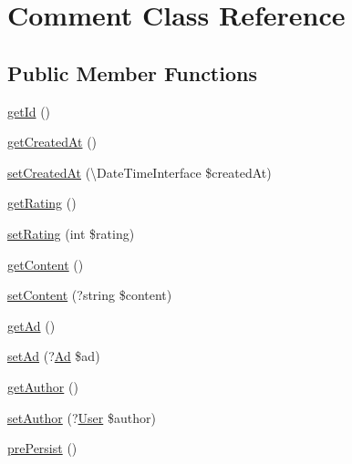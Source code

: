 \hypertarget{class_app_1_1_entity_1_1_comment}{}\section{Comment Class Reference}
\label{class_app_1_1_entity_1_1_comment}
\subsection*{Public Member Functions}
\begin{DoxyCompactItemize}
\item 
\mbox{\hyperlink{class_app_1_1_entity_1_1_comment_a12251d0c022e9e21c137a105ff683f13}{get\+Id}} ()
\item 
\mbox{\hyperlink{class_app_1_1_entity_1_1_comment_a0f0455d4aafe27d1b0720c3bcfff2847}{get\+Created\+At}} ()
\item 
\mbox{\hyperlink{class_app_1_1_entity_1_1_comment_a2308609ef549a753223bbee71e36291e}{set\+Created\+At}} (\textbackslash{}Date\+Time\+Interface \$created\+At)
\item 
\mbox{\hyperlink{class_app_1_1_entity_1_1_comment_a209cc2a79146f673389564ea1315c2a2}{get\+Rating}} ()
\item 
\mbox{\hyperlink{class_app_1_1_entity_1_1_comment_a46693f71b3a6b1cf691b65ba1e3e26a4}{set\+Rating}} (int \$rating)
\item 
\mbox{\hyperlink{class_app_1_1_entity_1_1_comment_a58e43f09a06ce4e29b192c4e17ce7915}{get\+Content}} ()
\item 
\mbox{\hyperlink{class_app_1_1_entity_1_1_comment_adbe841dc05e3e981d41c63dce68f8d20}{set\+Content}} (?string \$content)
\item 
\mbox{\hyperlink{class_app_1_1_entity_1_1_comment_acbaadb0b5b6f7e8ad6a9a0854e7fbf4c}{get\+Ad}} ()
\item 
\mbox{\hyperlink{class_app_1_1_entity_1_1_comment_a3f7c05734d0d1dbedb3ac722e171cc12}{set\+Ad}} (?\mbox{\hyperlink{class_app_1_1_entity_1_1_ad}{Ad}} \$ad)
\item 
\mbox{\hyperlink{class_app_1_1_entity_1_1_comment_a5286e30390ae3e1b274940286493dd24}{get\+Author}} ()
\item 
\mbox{\hyperlink{class_app_1_1_entity_1_1_comment_adc1408587dab3390f96d6d8bf16324e5}{set\+Author}} (?\mbox{\hyperlink{class_app_1_1_entity_1_1_user}{User}} \$author)
\item 
\mbox{\hyperlink{class_app_1_1_entity_1_1_comment_aaf176bf05676d9145be294568feae3e5}{pre\+Persist}} ()
\end{DoxyCompactItemize}


